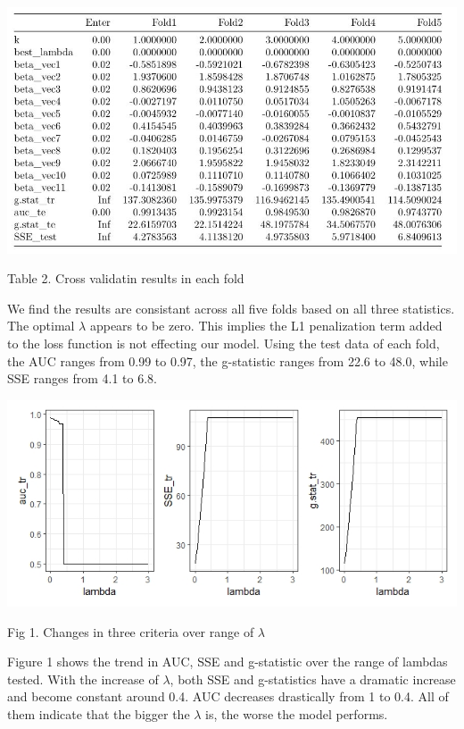 \documentclass[]{article}
\begin{document}
\begin{center}
\includegraphics{./results/Results from Yuqi.JPG}
\end{center}

\begin{center}
Table 2. Cross validatin results in each fold
\end{center}

We find the results are consistant across all five folds based on all
three statistics. The optimal \(\lambda\) appears to be zero. This
implies the L1 penalization term added to the loss function is not
effecting our model. Using the test data of each fold, the AUC ranges
from 0.99 to 0.97, the g-statistic ranges from 22.6 to 48.0, while SSE
ranges from 4.1 to 6.8.

\begin{center}
\includegraphics{./results/lambda_change.jpeg}
\end{center}

\begin{center}
Fig 1. Changes in three criteria over range of $\lambda$
\end{center}

Figure 1 shows the trend in AUC, SSE and g-statistic over the range of
lambdas tested. With the increase of \(\lambda\), both SSE and
g-statistics have a dramatic increase and become constant around 0.4.
AUC decreases drastically from 1 to 0.4. All of them indicate that the
bigger the \(\lambda\) is, the worse the model performs.
\end{document}
